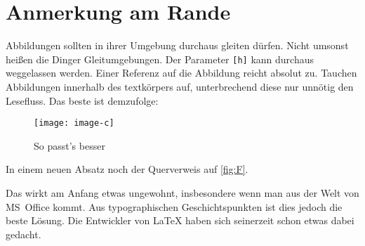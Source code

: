 \documentclass[english,ngerman]{tudscrartcl}
\newcommand*\ignorefloats{%
  \renewenvironment{figure}[1][]{}{}%
  \renewenvironment{table}[1][]{}{}%
  \renewcommand*\caption[1]{}%
  \renewcommand*\label[1]{}%
}
\begin{document}
\section{Anmerkung am Rande}
Abbildungen sollten in ihrer Umgebung durchaus gleiten dürfen. Nicht umsonst 
heißen die Dinger Gleitumgebungen. Der Parameter \verb|[h]| kann durchaus 
weggelassen werden. Einer Referenz auf die Abbildung reicht absolut zu. Tauchen 
Abbildungen innerhalb des textkörpers auf, unterbrechend diese nur unnötig den 
Lesefluss. Das beste ist demzufolge:
\let\NoIndentAfterThis\relax
%
\InputHook{\ignorefloats}
\begin{Excerpt}
\blindtext

\begin{figure}
\centering
\texttt{[image: image-c]}
\caption{So passt's besser}
\label{fig:F}
\end{figure}

In einem neuen Absatz noch der Querverweis auf \autoref{fig:F}.
\blindtext
\end{Excerpt}
%
\enlargethispage{\baselineskip}%
Das wirkt am Anfang etwas ungewohnt, insbesondere wenn man aus der Welt von 
MS~Office kommt. Aus typographischen Geschichtspunkten ist dies jedoch die 
beste Lösung. Die Entwickler von \LaTeX{} haben sich seinerzeit schon etwas 
dabei gedacht.
\end{document}
